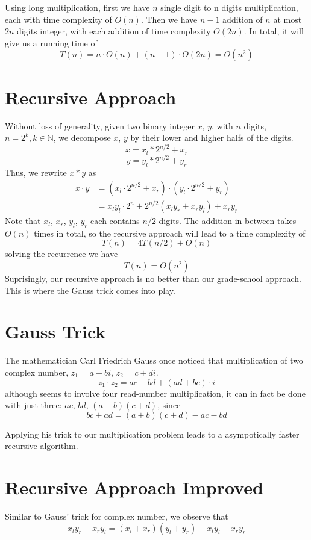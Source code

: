 \documentclass[12pt,a4paper]{amsart}
\numberwithin{equation}{section}
\theoremstyle{plain}
\theoremstyle{definition}
\begin{document}
Using long multiplication, first we have $n$ single digit to n digits multiplication, each
with time complexity of $O(n)$. Then we have $n - 1$ addition of $n$ at most $2n$ digits integer,
with each addition of time complexity $O(2n)$. In total, it will
give us a running time of
$$ T(n) = n \cdot O(n) + (n - 1) \cdot O(2n) = O(n^2) $$


\section{Recursive Approach}
Without loss of generality, given two binary integer $x$, $y$, with $n$ digits, $n = 2^k, k \in \mathbb{N}$,
we decompose $x$, $y$ by their lower and higher halfs of the digits.
$$ x = x_l * 2^{n/2} + x_r $$
$$ y = y_l * 2^{n/2} + y_r $$
Thus, we rewrite $x * y$ as
\begin{align*}
    x \cdot y &= (x_l \cdot 2^{n/2} + x_r) \cdot (y_l \cdot 2^{n/2} + y_r) \\
    &= x_l y_l \cdot 2^n + 2^{n/2} (x_l y_r + x_r y_l) + x_r y_r
\end{align*}
Note that $x_l$, $x_r$, $y_l$, $y_r$ each contains $n/2$ digits. The addition in between takes $O(n)$ times in total,
so the recursive approach will lead to a time complexity of
$$ T(n) = 4T(n/2) + O(n) $$
solving the recurrence we have
$$ T(n) = O(n^2) $$
Suprisingly, our recursive approach is no better than our grade-school approach. This is where the Gauss trick
comes into play.
\section{Gauss Trick}
The mathematician Carl Friedrich Gauss once noticed that multiplication of two complex number, $z_1 = a + b i$, $z_2 = c + d i$. 
$$ z_1 \cdot z_2 = a c - b d + (a d + b c) \cdot i $$
although seems to involve four read-number multiplication, it can in fact be done with just three: $a c$, $b d$, $(a + b)(c + d)$, since
$$ b c + a d = (a + b)(c + d) - a c - b d $$

Applying his trick to our multiplication problem leads to a asympotically faster recursive algorithm.

\section{Recursive Approach Improved}
Similar to Gauss' trick for complex number, we observe that
$$ x_l y_r + x_r y_l = (x_l + x_r)(y_l + y_r) - x_l y_l - x_r y_r $$
\end{document}
